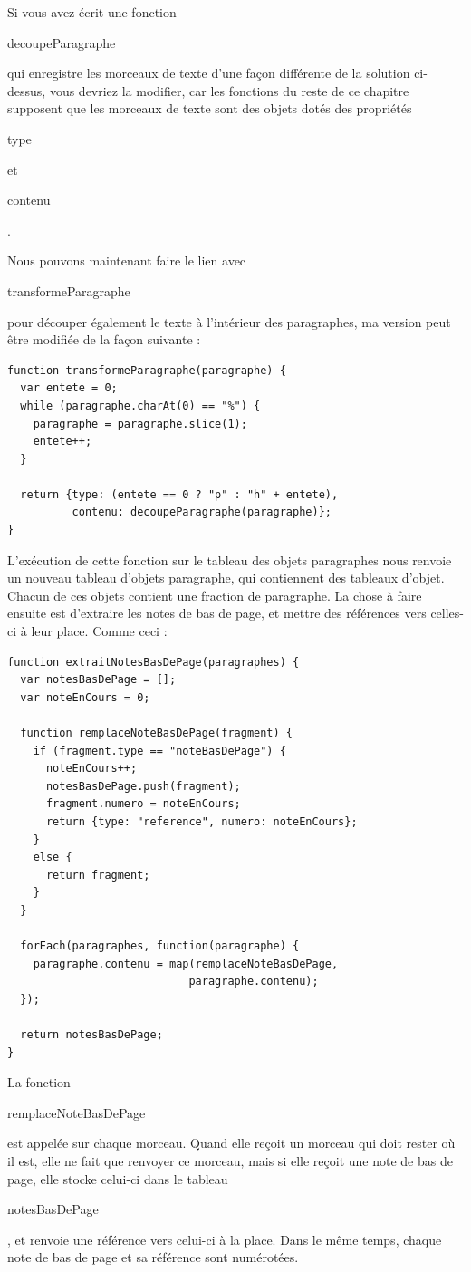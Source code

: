 \documentclass{FramateX}
\renewcommand{\texttt}[1]{\begin{sffamily}{#1}\end{sffamily}}
\begin{document}
Si vous avez écrit une fonction \texttt{decoupeParagraphe} qui
enregistre les morceaux de texte d'une façon différente de la solution
ci-dessus, vous devriez la modifier, car les fonctions du reste de ce
chapitre supposent que les morceaux de texte sont des objets dotés des
propriétés \texttt{type} et \texttt{contenu}.

\begin{center}\end{center}

Nous pouvons maintenant faire le lien avec \texttt{transformeParagraphe}
pour découper également le texte à l'intérieur des paragraphes, ma
version peut être modifiée de la façon suivante :

\begin{lstlisting}
function transformeParagraphe(paragraphe) {
  var entete = 0;
  while (paragraphe.charAt(0) == "%") {
    paragraphe = paragraphe.slice(1);
    entete++;
  }

  return {type: (entete == 0 ? "p" : "h" + entete),
          contenu: decoupeParagraphe(paragraphe)};
}
\end{lstlisting}
L'exécution de cette fonction sur le tableau des objets paragraphes nous
renvoie un nouveau tableau d'objets paragraphe, qui contiennent des
tableaux d'objet. Chacun de ces objets contient une fraction de
paragraphe. La chose à faire ensuite est d'extraire les notes de bas de
page, et mettre des références vers celles-ci à leur place. Comme ceci :

\begin{lstlisting}
function extraitNotesBasDePage(paragraphes) {
  var notesBasDePage = [];
  var noteEnCours = 0;

  function remplaceNoteBasDePage(fragment) {
    if (fragment.type == "noteBasDePage") {
      noteEnCours++;
      notesBasDePage.push(fragment);
      fragment.numero = noteEnCours;
      return {type: "reference", numero: noteEnCours};
    }
    else {
      return fragment;
    }
  }

  forEach(paragraphes, function(paragraphe) {
    paragraphe.contenu = map(remplaceNoteBasDePage,
                            paragraphe.contenu);
  });

  return notesBasDePage;
}
\end{lstlisting}
La fonction \texttt{remplaceNoteBasDePage} est appelée sur chaque
morceau. Quand elle reçoit un morceau qui doit rester où il est, elle ne
fait que renvoyer ce morceau, mais si elle reçoit une note de bas de
page, elle stocke celui-ci dans le tableau \texttt{notesBasDePage}, et
renvoie une référence vers celui-ci à la place. Dans le même temps,
chaque note de bas de page et sa référence sont numérotées.
\end{document}

